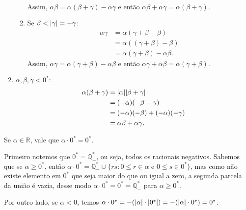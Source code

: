 \documentclass[../main.tex]{subfiles}
\begin{document}
\begin{dem}
\begin{enumerate}
\begin{enumerate}
\begin{align*}
                    \end{align*}
                    Assim, $\alpha\beta = \alpha(\beta+\gamma) - \alpha\gamma$ e então $\alpha\beta + \alpha\gamma = \alpha(\beta+\gamma)$.
                \item Se $\beta < \abs{\gamma} = -\gamma$:
                    \begin{align*}
                        \alpha\gamma &= \alpha(\gamma+\beta-\beta) \\
                        &= \alpha((\gamma+\beta)-\beta) \\
                        &= \alpha(\gamma+\beta) - \alpha\beta.
                    \end{align*}
                    Assim, $\alpha\gamma = \alpha(\gamma+\beta) - \alpha\beta$ e então $\alpha\gamma + \alpha\beta = \alpha(\gamma+\beta)$.
            \end{enumerate}
        \item $\alpha,\beta,\gamma < 0^*$:
        \begin{align*}
            \alpha(\beta+\gamma) &= \abs{\alpha}\abs{\beta+\gamma} \\
            &= (-\alpha)(-\beta-\gamma) \\
            &= (-\alpha)(-\beta) + (-\alpha)(-\gamma) \\
            &= \alpha\beta + \alpha\gamma.
        \end{align*}
    \end{enumerate}
\end{dem}

\begin{teo}\label{reais-teo-anulamentoProduto}
    Se $\alpha \in \mathbb{R}$, vale que $\alpha \cdot 0^* = 0^*$.
\end{teo}
\begin{dem}
    Primeiro notemos que $0^* = \mathbb{Q}_{-}^*$, ou seja, todos os racionais negativos. Sabemos que se $\alpha \geq 0^*$, 
    então $\alpha \cdot 0^* = \mathbb{Q}_{-}^* \cup \{ rs : 0 \leq r \in \alpha$ e $0 \leq s \in 0^* \}$, mas como não existe elemento em $0^*$ que seja maior do que ou igual a zero, a segunda parcela da união é vazia, desse modo $\alpha \cdot 0^* = 0^* = \mathbb{Q}_{-}^*$ para $\alpha \geq 0^*$.

    Por outro lado, se $\alpha < 0$, temos $\alpha \cdot 0^* = -(\abs{\alpha} \cdot \abs{0^*}) = -(\abs{\alpha} \cdot 0^*) = 0^*$.
\end{dem}
\end{document}
